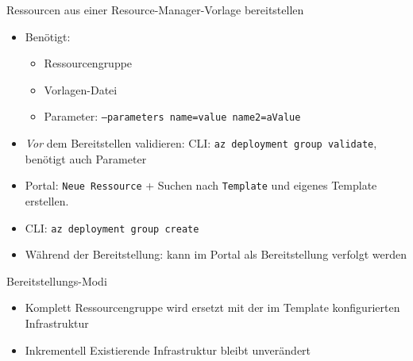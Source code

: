 \begin{flashcard}[Definition]{Ressourcen aus einer Resource-Manager-Vorlage bereitstellen}
    \begin{itemize}
        \item Benötigt:
            \begin{itemize}
                \item Ressourcengruppe
                \item Vorlagen-Datei
                \item Parameter: \texttt{--parameters name=value name2=aValue}
            \end{itemize}
        \item \emph{Vor} dem Bereitstellen validieren:\newline
            CLI: \texttt{az deployment group validate}, benötigt auch Parameter
        \item Portal: \texttt{Neue Ressource} + Suchen nach \texttt{Template} und eigenes Template erstellen.
        \item CLI: \texttt{az deployment group create}
        \item Während der Bereitstellung: kann im Portal als Bereitstellung verfolgt werden
    \end{itemize}
\end{flashcard}

\begin{flashcard}[Definition]{Bereitstellungs-Modi}
    \begin{itemize}
        \item Komplett\newline
            Ressourcengruppe wird ersetzt mit der im Template konfigurierten Infrastruktur
        \item Inkrementell\newline
            Existierende Infrastruktur bleibt unverändert
    \end{itemize}
\end{flashcard}


